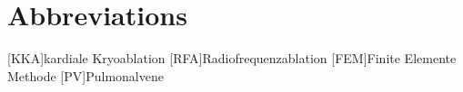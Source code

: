 
\tableofcontents

\emptyPage

\listoffigures

\emptyPage

\listoftables

\emptyPage

\chapter*{Abbreviations}
\label{sec:03_Abbreviations}
\begin{acronym}
[KKA]{kardiale Kryoablation}
[RFA]{Radiofrequenzablation}
[FEM]{Finite Elemente Methode}
[PV]{Pulmonalvene}
\end{acronym}